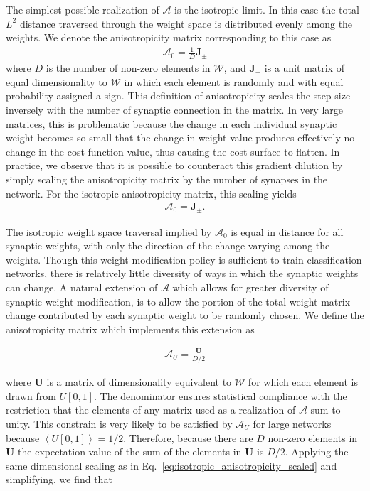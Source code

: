 \documentclass[11pt]{afthesis}
\begin{document}
	The simplest possible realization of $\boldsymbol{\mathcal{A}}$ is the isotropic limit. In this case the total $L^2$ distance traversed through the weight space is distributed evenly among the weights. We denote the anisotropicity matrix corresponding to this case as
	\begin{align}\label{eq:isotropic_anisotropicity}
	\boldsymbol{\mathcal{A}}_0 = \frac{1}{D}  \boldsymbol{J}_{\pm}
	\end{align}
	\noindent where $D$ is the number of non-zero elements in $\boldsymbol{\mathcal{W}}$, and $\boldsymbol{J}_{\pm}$ is a unit matrix of equal dimensionality to $\boldsymbol{\mathcal{W}}$ in which each element is randomly and with equal probability assigned a sign. This definition of anisotropicity scales the step size inversely with the number of synaptic connection in the matrix. In very large matrices, this is problematic because the change in each individual synaptic weight becomes so small that the change in weight value produces effectively no change in the cost function value, thus causing the cost surface to flatten. In practice, we observe that it is possible to counteract this gradient dilution by simply scaling the anisotropicity matrix by the number of synapses in the network. For the isotropic anisotropicity matrix, this scaling yields
	\begin{align}\label{eq:isotropic_anisotropicity_scaled}
	\boldsymbol{\mathcal{A}}_0 =  \boldsymbol{J}_{\pm}.
	\end{align} 
	
	The isotropic weight space traversal implied by $\boldsymbol{\mathcal{A}}_0$ is equal in distance for all synaptic weights, with only the direction of the change varying among the weights. Though this weight modification policy is sufficient to train classification networks, there is relatively little diversity of ways in which the synaptic weights can change. A natural extension of $\boldsymbol{\mathcal{A}}$ which allows for greater diversity of synaptic weight modification, is to allow the portion of the total weight matrix change contributed by each synaptic weight to be randomly chosen. We define the anisotropicity matrix which implements this extension as
	
	\begin{align}
	\boldsymbol{\mathcal{A}}_U =  \frac{\boldsymbol{U}}{D/2}
	\end{align}
	
	\noindent where $\boldsymbol{U}$ is a matrix of dimensionality equivalent to $\boldsymbol{\mathcal{W}}$ for which each element is drawn from $U[0,1]$.  The denominator ensures statistical compliance with the restriction that the elements of any matrix used as a realization of $\boldsymbol{\mathcal{A}}$ sum to unity. This constrain is very likely to be satisfied by $\boldsymbol{\mathcal{A}}_U$ for large networks because $\left\langle  U[0,1] \right\rangle =1/2$. Therefore, because there are $D$ non-zero elements in $\boldsymbol{U}$ the expectation value of the sum of the elements in $\boldsymbol{U}$ is $D/2$. Applying the same dimensional scaling as in Eq.~\ref{eq:isotropic_anisotropicity_scaled} and simplifying, we find that
	
\end{document}
